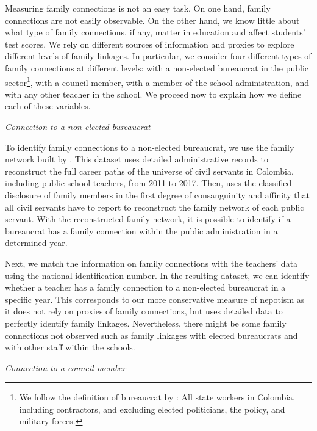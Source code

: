 \documentclass[12pt,runningheads]{article}
\begin{document}
Measuring family connections is not an easy task. On one hand, family connections are not easily observable. On the other hand, we know little about what type of family connections, if any, matter in education and affect students' test scores. We rely on different sources of information and proxies to explore different levels of family linkages. In particular, we consider four different types of family connections at different levels: with a non-elected bureaucrat in the public sector\footnote{We follow the definition of bureaucrat by \cite{Riano2021}: All state workers in Colombia, including contractors, and excluding elected politicians, the policy, and military forces.}, with a council member, with a member of the school administration, and with any other teacher in the school. We proceed now to explain how we define each of these variables.

\noindent \textit{Connection to a non-elected bureaucrat}

To identify family connections to a non-elected bureaucrat, we use the family network built by \cite{Riano2021}. This dataset uses detailed administrative records to reconstruct the full career paths of the universe of civil servants in Colombia, including public school teachers, from 2011 to 2017. Then, \cite{Riano2021} uses the classified disclosure of family members in the first degree of consanguinity and affinity that all civil servants have to report to reconstruct the family network of each public servant. With the reconstructed family network, it is possible to identify if a bureaucrat has a family connection within the public administration in a determined year.
 
Next, we match the information on family connections with the teachers' data using the national identification number. In the resulting dataset, we can identify whether a teacher has a family connection to a non-elected bureaucrat in a specific year. This corresponds to our more conservative measure of nepotism as it does not rely on proxies of family connections, but uses detailed data to perfectly identify family linkages. Nevertheless, there might be some family connections not observed such as family linkages with elected bureaucrats and with other staff within the schools.

\noindent \textit{Connection to a council member}
\end{document}
